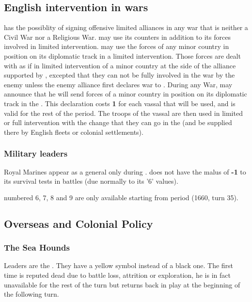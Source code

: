 \label{chSpecific:England}
\subsection{English intervention in wars}
\aparag \ENG has the possiblity of signing offensive limited alliances in any
war that is neither a Civil War nor a Religious War.
\aparag \ENG may use its \corsaire counters in addition to its forces
involved in limited intervention.
\aparag\label{chSpecific:England:Minors at war} \ENG may use the forces of any
minor country in \VASSAL position on its diplomatic track in a limited
intervention. Those forces are dealt with as if in limited intervention
of a minor country at the side of the alliance supported by \ENG,
excepted that they can not be fully involved in the war by the enemy
unless the enemy alliance first declares war to \ENG.
\aparag During any War, \ENG may announce that he will send forces of a
minor country in \VASSAL position on its diplomatic track in the
\ROTW. This declaration costs {\bf 1} \STAB for each vassal that will be
used, and is valid for the rest of the period. The troops of the vassal
are then used in limited or full intervention with the change that they
can go in the \ROTW (and be supplied there by English fleets or colonial
settlements).
\subsubsection{Military leaders}
\aparag\label{rule:RoyalMarines} Royal Marines appear as a general only
during .
\aparag {} does not have the malus of {\bf -1} to its
survival tests in battles (due normally to its '6' values).

 \anonyme\LeaderA numbered 6, 7, 8 and 9
are only available starting from period  (1660, turn 35).

\subsection{Overseas and Colonial Policy}
\subsubsection{The Sea Hounds}\label{chSpecific:England:Sea Hounds}
\aparag Leaders 
are the . They have a yellow symbol instead of a
black one.
\bparag[Drake] The first time  is reputed dead due to
battle loss, attrition or exploration, he is in fact unavailable for
the rest of the turn but returns back in play at the beginning of the
following turn.

